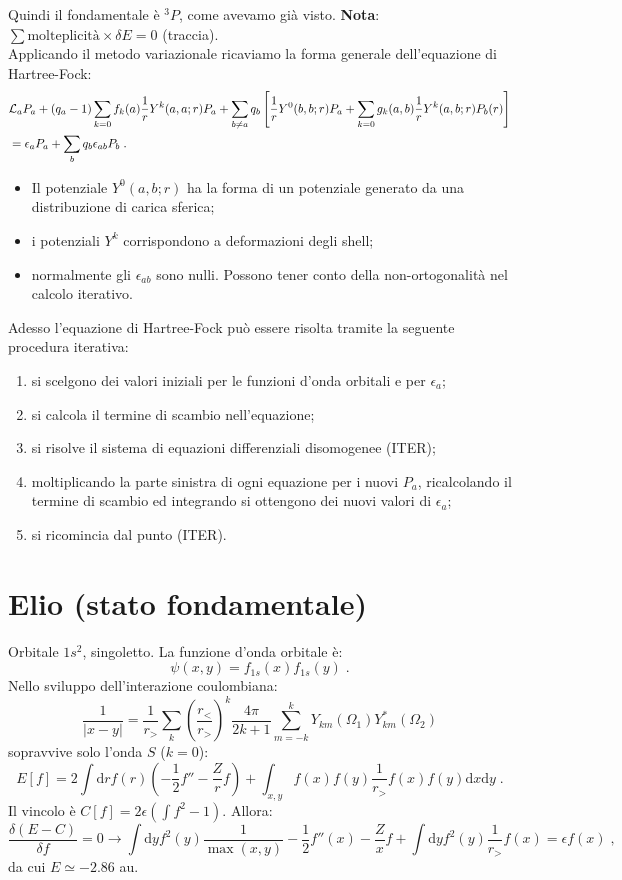 \documentclass[10pt,a4paper]{report}
\theoremstyle{definition}
\newcommand{\lag}{\mathcal{L}}
\numberwithin{equation}{section}
\newcommand{\diff}[1][]{\mathrm{d}#1}
\begin{document}
Quindi il fondamentale è ${}^3P$, come avevamo già visto. \textbf{Nota}: $\sum \mbox{molteplicità}\times\delta E=0$ (traccia). \\
Applicando il metodo variazionale ricaviamo la forma generale dell'equazione di Hartree-Fock:
\begin{align}
&\lag_aP_a+(q_a-1)\sum_{k=0} f_k(a)\frac{1}{r}Y^k(a,a;r)P_a+\sum_{b\ne a}q_b\left[\frac{1}{r}Y^0(b,b;r)P_a+\sum_{k=0}g_k(a,b)\frac{1}{r}Y^k(a,b;r)P_b(r)\right] \notag \\
&=\epsilon_aP_a+\sum_bq_b\epsilon_{ab}P_b\;.
\end{align}
\begin{itemize}
\item Il potenziale $Y^0(a,b;r)$ ha la forma di un potenziale generato da una distribuzione di carica sferica;
\item i potenziali $Y^k$ corrispondono a deformazioni degli shell;
\item normalmente gli $\epsilon_{ab}$ sono nulli. Possono tener conto della non-ortogonalità nel calcolo iterativo.
\end{itemize}
Adesso l'equazione di Hartree-Fock può essere risolta tramite la seguente procedura iterativa:
\begin{enumerate}
\item si scelgono dei valori iniziali per le funzioni d'onda orbitali e per $\epsilon_a$;
\item si calcola il termine di scambio nell'equazione;
\item si risolve il sistema di equazioni differenziali disomogenee (ITER);
\item moltiplicando la parte sinistra di ogni equazione per i nuovi $P_a$, ricalcolando il termine di scambio ed integrando si ottengono dei nuovi valori di $\epsilon_a$;
\item si ricomincia dal punto (ITER).
\end{enumerate}
\section{Elio (stato fondamentale)}
Orbitale $1s^2$, singoletto. La funzione d'onda orbitale è:
\begin{equation}
\psi(x,y)=f_{1s}(x)f_{1s}(y)\;.
\end{equation}
Nello sviluppo dell'interazione coulombiana:
\begin{equation}
\frac{1}{|x-y|}=\frac{1}{r_>}\sum_k\left(\frac{r_<}{r_>}\right)^k\frac{4\pi}{2k+1}\sum_{m=-k}^{k}Y_{km}(\Omega_1)Y^*_{km}(\Omega_2)
\end{equation}
sopravvive solo l'onda $S$ ($k=0$):
\begin{equation}
E[f]=2\int\diff{r}f(r)\left(-\frac{1}{2}f''-\frac{Z}{r}f\right)+\int_{x,y}f(x)f(y)\frac{1}{r_>}f(x)f(y)\diff{x}\diff{y}\;.
\end{equation}
Il vincolo è $C[f]=2\epsilon\left(\int f^2-1\right)$. Allora:
\begin{equation}
\frac{\delta(E-C)}{\delta f}=0\longrightarrow \int\diff{y}f^2(y)\frac{1}{\max(x,y)}-\frac{1}{2}f''(x)-\frac{Z}{x}f+\int\diff{y}f^2(y)\frac{1}{r_>}f(x)=\epsilon f(x)\;,
\end{equation}
da cui $E\simeq -2.86$ au.
\end{document}
